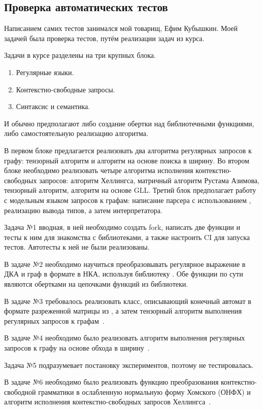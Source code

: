 \subsection{Проверка автоматических тестов}
\label{subsec:slns}

Написанием самих тестов занимался мой товарищ, Ефим Кубышкин.
Моей задачей была проверка тестов, путём реализации задач из курса.

Задачи в курсе разделены на три крупных блока.
\begin{enumerate}
    \item Регулярные языки.
    \item Контекстно-свободные запросы.
    \item Синтаксис и семантика.
\end{enumerate}
И обычно предполагают либо создание обертки над библиотечными функциями, либо самостоятельную реализацию алгоритма.

В первом блоке предлагается реализовать два алгоритма регулярных запросов к графу: тензорный алгоритм и алгоритм на основе поиска в ширину.
Во втором блоке необходимо реализовать четыре алгоритма исполнения контекстно-свободных запросов: алгоритм Хеллингса, матричный алгоритм Рустама Азимова, тензорный алгоритм, алгоритм на основе GLL.
Третий блок предполагает работу с модельным языком запросов к графам: написание парсера с использованием \antlr{}, реализацию вывода типов, а затем интерпретатора.

Задача №1 вводная, в ней необходимо создать fork, написать две функции и тесты к ним для знакомства с библиотеками, а также настроить CI для запуска тестов.
Автотесты к ней не были реализованы.

В задаче №2 необходимо научиться преобразовывать регулярное выражение в ДКА и граф в формате \networkx{} в НКА, используя библиотеку \pyformlang{}.
Обе функции по сути являются обертками на цепочками функций из библиотеки.

В задаче №3 требовалось реализовать класс, описывающий конечный автомат в формате разреженной матрицы из \scipy{}, а затем тензорный алгоритм выполнения регулярных запросов к графам~\cite{shemetovaOneAlgorithmEvaluate2021}.

В задаче №4 необходимо было реализовать алгоритм выполнения регулярных запросов к графу на основе обхода в ширину~\cite{elekesGraphBLASSolutionSIGMOD2020}.

Задача №5 подразумевает постановку экспериментов, поэтому не тестировалась.

В задаче №6 необходимо было реализовать функцию преобразования контекстно-свободной грамматики в ослабленную нормальную форму Хомского (ОНФХ) и алгоритм исполнения контекстно-свободных запросов Хеллингса~\cite{hellingsConjunctiveContextFreePath2014}.


